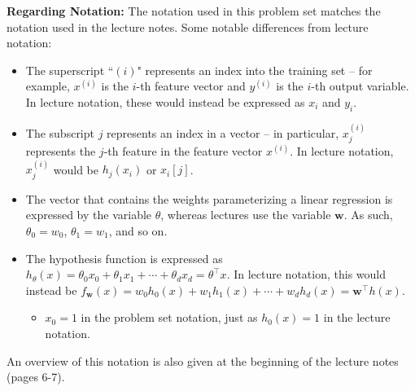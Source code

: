 \textbf{Regarding Notation:} The notation used in this problem set matches the notation used in the lecture notes. Some notable differences from lecture notation: 
\begin{itemize}
    \item The superscript ``$(i)$" represents an index into the training set -- for example, $x^{(i)}$ is the $i$-th feature vector and $y^{(i)}$ is the $i$-th output variable. In lecture notation, these would instead be expressed as $x_i$ and $y_i$.

    \item The subscript $j$ represents an index in a vector -- in particular, $x^{(i)}_j$ represents the $j$-th feature in the feature vector $x^{(i)}$. In lecture notation, $x^{(i)}_j$ would be $h_j(x_i)$ or $x_i[j]$.

    \item The vector that contains the weights parameterizing a linear regression is expressed by the variable $\theta$, whereas lectures use the variable $\textbf{w}$. As such, $\theta_0 = w_0$, $\theta_1 = w_1$, and so on.

    \item The hypothesis function is expressed as $h_\theta(x) = \theta_0 x_0 + \theta_1 x_1 + \cdots + \theta_d x_d = \theta^\top x$. In lecture notation, this would instead be $f_\textbf{w}(x) = w_0 h_0(x) + w_1 h_1(x) + \cdots + w_d h_d(x) = \textbf{w}^\top h(x)$. \begin{itemize}

        \item $x_0 = 1$ in the problem set notation, just as $h_0(x) = 1$ in the lecture notation.

    \end{itemize}
\end{itemize}

An overview of this notation is also given at the beginning of the lecture notes (pages 6-7).